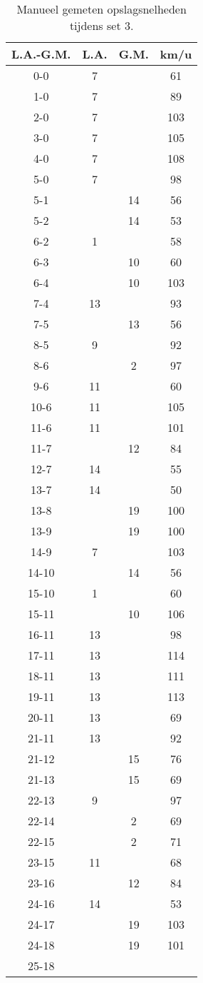 \begin{table}[ht!]
  \centering
  \scriptsize
  \begin{tabular}{|c|c|c|c|} \hline
    L.A.-G.M. & L.A. & G.M. & km/u \\ \hline
    0-0 & 7 & & 61 \\
    1-0 & 7 & & 89 \\
    2-0 & 7 & & 103 \\
    3-0 & 7 & & 105 \\
    4-0 & 7 & & 108 \\
    5-0 & 7 & & 98 \\
    5-1 & & 14 & 56 \\
    5-2 & & 14 & 53 \\
    6-2 & 1 & & 58 \\
    6-3 & & 10 & 60 \\
    6-4 & & 10 & 103 \\
    7-4 & 13 & & 93 \\
    7-5 &  & 13 & 56 \\
    8-5 & 9 & & 92 \\
    8-6 &  & 2 & 97 \\
    9-6 & 11 & & 60 \\
    10-6 & 11 & & 105 \\
    11-6 & 11 & & 101 \\
    11-7 & & 12 & 84 \\
    12-7 & 14 & & 55 \\
    13-7 & 14 & & 50 \\
    13-8 & & 19 & 100 \\
    13-9 & & 19 & 100 \\
    14-9 & 7 & & 103 \\
    14-10 & & 14 & 56 \\
    15-10 & 1 & & 60 \\
    15-11 & & 10 & 106 \\
    16-11 & 13 & & 98 \\
    17-11 & 13 & & 114 \\
    18-11 & 13 & & 111 \\
    19-11 & 13 & & 113 \\
    20-11 & 13 & & 69 \\
    21-11 & 13 & & 92 \\
    21-12 & & 15 & 76 \\
    21-13 & & 15 & 69 \\
    22-13 & 9 & & 97 \\
    22-14 & & 2 & 69 \\
    22-15 & & 2 & 71 \\
    23-15 & 11 & & 68 \\
    23-16 & & 12 & 84 \\
    24-16 & 14 & & 53 \\
    24-17 & & 19 & 103 \\
    24-18 & & 19 & 101 \\
    25-18 & & & \\ \hline
  \end{tabular}
  \caption[Manueel gemeten opslagsnelheden tijdens set 3]{\label{tab:PL1ServeMan3}Manueel gemeten opslagsnelheden tijdens set 3.}
\end{table}

